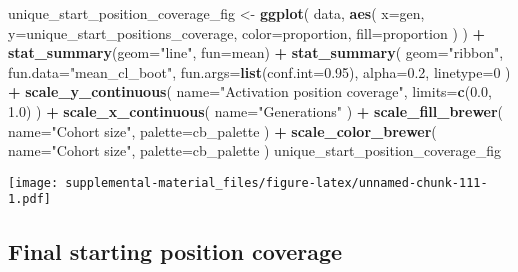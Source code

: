 \documentclass[]{book}
\newenvironment{Shaded}{\begin{snugshade}}{\end{snugshade}}
\newcommand{\DataTypeTok}[1]{\textcolor[rgb]{0.13,0.29,0.53}{#1}}
\newcommand{\DecValTok}[1]{\textcolor[rgb]{0.00,0.00,0.81}{#1}}
\newcommand{\FloatTok}[1]{\textcolor[rgb]{0.00,0.00,0.81}{#1}}
\newcommand{\KeywordTok}[1]{\textcolor[rgb]{0.13,0.29,0.53}{\textbf{#1}}}
\newcommand{\NormalTok}[1]{#1}
\newcommand{\OperatorTok}[1]{\textcolor[rgb]{0.81,0.36,0.00}{\textbf{#1}}}
\newcommand{\StringTok}[1]{\textcolor[rgb]{0.31,0.60,0.02}{#1}}
\begin{document}
\begin{Shaded}
\begin{Highlighting}[]
\NormalTok{unique_start_position_coverage_fig <-}\StringTok{ }\KeywordTok{ggplot}\NormalTok{(}
\NormalTok{    data,}
    \KeywordTok{aes}\NormalTok{(}
      \DataTypeTok{x=}\NormalTok{gen,}
      \DataTypeTok{y=}\NormalTok{unique_start_positions_coverage,}
      \DataTypeTok{color=}\NormalTok{proportion,}
      \DataTypeTok{fill=}\NormalTok{proportion}
\NormalTok{    )}
\NormalTok{  ) }\OperatorTok{+}
\StringTok{  }\KeywordTok{stat_summary}\NormalTok{(}\DataTypeTok{geom=}\StringTok{"line"}\NormalTok{, }\DataTypeTok{fun=}\NormalTok{mean) }\OperatorTok{+}
\StringTok{  }\KeywordTok{stat_summary}\NormalTok{(}
    \DataTypeTok{geom=}\StringTok{"ribbon"}\NormalTok{,}
    \DataTypeTok{fun.data=}\StringTok{"mean_cl_boot"}\NormalTok{,}
    \DataTypeTok{fun.args=}\KeywordTok{list}\NormalTok{(}\DataTypeTok{conf.int=}\FloatTok{0.95}\NormalTok{),}
    \DataTypeTok{alpha=}\FloatTok{0.2}\NormalTok{,}
    \DataTypeTok{linetype=}\DecValTok{0}
\NormalTok{  ) }\OperatorTok{+}
\StringTok{  }\KeywordTok{scale_y_continuous}\NormalTok{(}
    \DataTypeTok{name=}\StringTok{"Activation position coverage"}\NormalTok{,}
    \DataTypeTok{limits=}\KeywordTok{c}\NormalTok{(}\FloatTok{0.0}\NormalTok{, }\FloatTok{1.0}\NormalTok{)}
\NormalTok{  ) }\OperatorTok{+}
\StringTok{  }\KeywordTok{scale_x_continuous}\NormalTok{(}
    \DataTypeTok{name=}\StringTok{"Generations"}
\NormalTok{  ) }\OperatorTok{+}
\StringTok{  }\KeywordTok{scale_fill_brewer}\NormalTok{(}
    \DataTypeTok{name=}\StringTok{"Cohort size"}\NormalTok{,}
    \DataTypeTok{palette=}\NormalTok{cb_palette}
\NormalTok{  ) }\OperatorTok{+}
\StringTok{  }\KeywordTok{scale_color_brewer}\NormalTok{(}
    \DataTypeTok{name=}\StringTok{"Cohort size"}\NormalTok{,}
    \DataTypeTok{palette=}\NormalTok{cb_palette}
\NormalTok{  )}
\NormalTok{unique_start_position_coverage_fig}
\end{Highlighting}
\end{Shaded}

\texttt{[image: supplemental-material\_files/figure-latex/unnamed-chunk-111-1.pdf]}

\hypertarget{final-starting-position-coverage-8}{%
\subsection{Final starting position coverage}\label{final-starting-position-coverage-8}}
\end{document}
